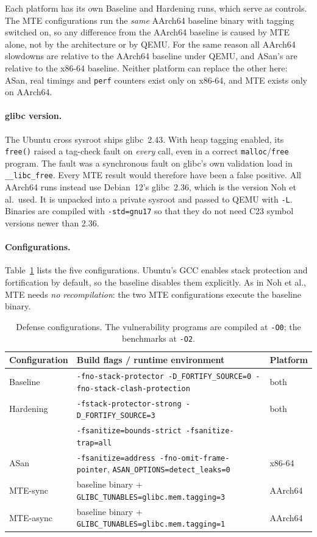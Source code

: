 \documentclass[11pt,a4paper]{article}
\begin{document}
Each platform has its own Baseline and Hardening runs, which serve as controls.
The MTE configurations run the \emph{same} AArch64 baseline binary with tagging switched on, so any difference from the AArch64 baseline is caused by MTE alone, not by the architecture or by QEMU.
For the same reason all AArch64 slowdowns are relative to the AArch64 baseline under QEMU, and ASan's are relative to the x86-64 baseline.
Neither platform can replace the other here: ASan, real timings and \texttt{perf} counters exist only on x86-64, and MTE exists only on AArch64.

\paragraph{glibc version.}
The Ubuntu cross sysroot ships glibc~2.43.
With heap tagging enabled, its \texttt{free()} raised a tag-check fault on \emph{every} call, even in a correct \texttt{malloc}/\texttt{free} program.
The fault was a synchronous fault on glibc's own validation load in \texttt{\_\_libc\_free}.
Every MTE result would therefore have been a false positive.
All AArch64 runs instead use Debian~12's glibc~2.36, which is the version Noh et al.\ used.
It is unpacked into a private sysroot and passed to QEMU with \texttt{-L}.
Binaries are compiled with \texttt{-std=gnu17} so that they do not need C23 symbol versions newer than 2.36.

\paragraph{Configurations.}
Table~\ref{tab:configs} lists the five configurations.
Ubuntu's GCC enables stack protection and fortification by default, so the baseline disables them explicitly.
As in Noh et al., MTE needs \emph{no recompilation}: the two MTE configurations execute the baseline binary.

\begin{table}[t]
\centering\footnotesize
\begin{tabular}{@{}lll@{}}
\toprule
Configuration & Build flags / runtime environment & Platform\\
\midrule
Baseline & \texttt{-fno-stack-protector -D\_FORTIFY\_SOURCE=0 -fno-stack-clash-protection} & both\\
Hardening & \texttt{-fstack-protector-strong -D\_FORTIFY\_SOURCE=3} & both\\
 & \texttt{-fsanitize=bounds-strict -fsanitize-trap=all} & \\
ASan & \texttt{-fsanitize=address -fno-omit-frame-pointer}, \texttt{ASAN\_OPTIONS=detect\_leaks=0} & x86-64\\
MTE-sync & baseline binary + \texttt{GLIBC\_TUNABLES=glibc.mem.tagging=3} & AArch64\\
MTE-async & baseline binary + \texttt{GLIBC\_TUNABLES=glibc.mem.tagging=1} & AArch64\\
\bottomrule
\end{tabular}
\caption{Defense configurations. The vulnerability programs are compiled at \texttt{-O0}; the benchmarks at \texttt{-O2}.}
\label{tab:configs}
\end{table}
\end{document}
